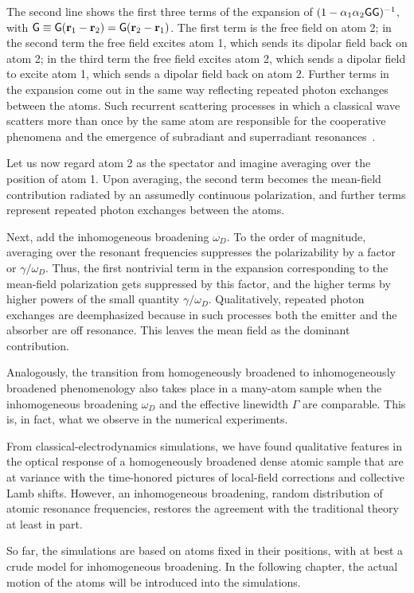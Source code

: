 The second line shows the first three terms of the expansion of $(1-\alpha_1\alpha_2{\sf G}{\sf G})^{-1}$, with ${\sf G}\equiv{\sf G}({\bf r}_1-{\bf r}_2)={\sf G}({\bf r}_2-{\bf r}_1)$. The first term is the free field on atom 2; in the second term the free field excites atom 1, which sends its dipolar field back on atom 2; in the third term the free field excites atom 2, which sends a dipolar field to excite atom 1, which sends a dipolar field back on atom 2. Further terms in the expansion come out in the same way reflecting repeated photon exchanges between the atoms. Such recurrent scattering processes in which a classical wave scatters more than once by the same atom are responsible for the cooperative phenomena and the emergence of subradiant and superradiant resonances~\cite{PhysRevA.55.513,PhysRevA.86.031602,PhysRevB.86.085116}.

Let us now regard atom 2 as the spectator and imagine averaging over the position of atom 1. Upon averaging, the second term becomes the mean-field contribution radiated by an assumedly continuous polarization, and further terms represent repeated photon exchanges between the atoms. 

Next, add the inhomogeneous broadening $\omega_D$. To the order of magnitude, averaging over the resonant frequencies suppresses the polarizability by a factor or $\gamma/\omega_D$. Thus, the first nontrivial term in the expansion corresponding to the mean-field polarization gets suppressed by this factor, and the higher terms by higher powers of the small quantity $\gamma/\omega_D$. Qualitatively, repeated photon exchanges are deemphasized because in such processes both the emitter and the absorber are off resonance. This leaves the mean field as the dominant contribution.

Analogously, the transition from homogeneously broadened to inhomogeneously broadened phenomenology also takes place in a many-atom sample when the inhomogeneous broadening $\omega_D$ and the effective linewidth $\Gamma$ are comparable. This is, in fact, what we observe in the numerical experiments.

From classical-electrodynamics simulations, we have found qualitative features in the optical response of a homogeneously broadened dense atomic sample that are at variance with the time-honored pictures of local-field corrections and collective Lamb shifts. However, an inhomogeneous broadening, random distribution of atomic resonance frequencies, restores the agreement with the traditional theory at least in part.

So far, the simulations are based on atoms fixed in their positions, with at best a crude model for inhomogeneous broadening. In the following chapter, the actual motion of the atoms will be introduced into the simulations.

